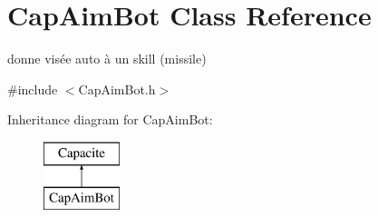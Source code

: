 \hypertarget{class_cap_aim_bot}{}\section{Cap\+Aim\+Bot Class Reference}
\label{class_cap_aim_bot}


donne visée auto à un skill (missile)  




{\ttfamily \#include $<$Cap\+Aim\+Bot.\+h$>$}

Inheritance diagram for Cap\+Aim\+Bot\+:\begin{figure}[H]
\begin{center}
\leavevmode
\includegraphics[height=2.000000cm]{class_cap_aim_bot}
\end{center}
\end{figure}

